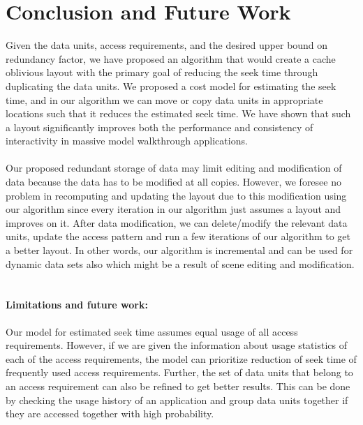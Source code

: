 
\section{Conclusion and Future Work}

Given the data units, access requirements, and the desired upper bound on
redundancy factor, we have proposed an algorithm that would create a cache
oblivious layout with the primary goal of reducing the seek time through
duplicating the data units. We proposed a cost model for estimating the seek
time, and in our algorithm we can move or copy data units in appropriate
locations such that it reduces the estimated seek time.  We have shown that
such a layout significantly improves both the performance and consistency of
interactivity in massive model walkthrough applications.  \\ \\
Our proposed redundant storage of data may limit editing and modification of data because the data has to be modified at all copies. However, we foresee no problem in recomputing and updating the layout due to this modification using our algorithm since every iteration in our algorithm just assumes a layout and improves on it. After data modification, we can delete/modify the relevant data units, update the access pattern and run a few iterations of our algorithm to get a better layout. In other words, our algorithm is incremental and can be used for dynamic data sets also which might be a result of scene editing and modification.\\
\\
\paragraph{Limitations and future work:}
Our model for estimated seek time assumes equal usage of all access requirements. However, if we are given the information about usage statistics of each of the access requirements, the model can prioritize reduction of seek time of frequently used access requirements. Further, the set of data units that belong to an access requirement can also be refined to get better results. This can be done by checking the usage history of an application and group data units together if they are accessed together with high probability.

